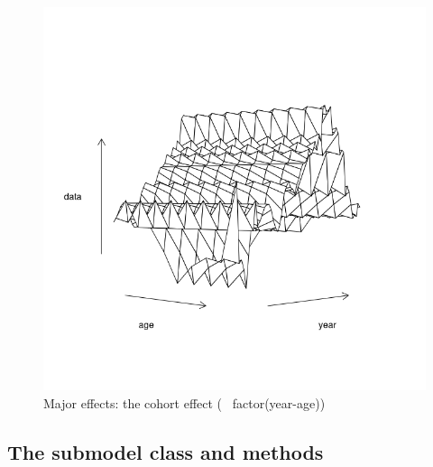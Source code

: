 \documentclass[a4paper,english,11pt]{article}
\begin{document}
\begin{knitrout}
\color{fgcolor}\begin{kframe}
\begin{alltt}
\hldef{(}  \hldef{=} \hldef{)}
\end{alltt}
\end{kframe}\begin{figure}[H]

{\centering \includegraphics[width=.9\linewidth]{figure/majeffc-1} 

}

\caption[Major effects]{Major effects: the cohort effect (~ factor(year-age))}\label{fig:majeffc}
\end{figure}

\end{knitrout}

\subsection{The submodel class and methods}
\end{document}
